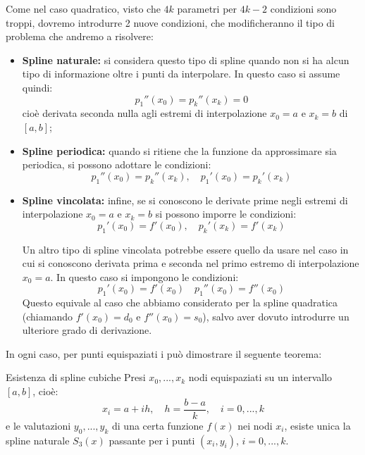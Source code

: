 \documentclass[a4paper,11pt]{article}
\begin{document}
Come nel caso quadratico, visto che $4k$ parametri per $4k - 2$ condizioni sono troppi, dovremo introdurre 2 nuove condizioni, che modificheranno il tipo di problema che andremo a risolvere:
\begin{itemize}
	\item \textbf{Spline naturale:} si considera questo tipo di spline quando non si ha alcun tipo di informazione oltre i punti da interpolare. In questo caso si assume quindi:
		$$
		p_1''(x_0) = p_k''(x_k) = 0
		$$
		cioè derivata seconda nulla agli estremi di interpolazione $x_0 = a$ e $x_k = b$ di $[a, b]$;
	\item \textbf{Spline periodica:} quando si ritiene che la funzione da approssimare sia periodica, si possono adottare le condizioni:
		$$
		p_1''(x_0) = p_k''(x_k), \quad p_1'(x_0) = p_k'(x_k)
		$$
	\item \textbf{Spline vincolata:} infine, se si conoscono le derivate prime negli estremi di interpolazione $x_0 = a$ e $x_k = b$ si possono imporre le condizioni:
		$$
		p_1'(x_0) = f'(x_0), \quad p_k'(x_k) = f'(x_k)
		$$
		
		Un altro tipo di spline vincolata potrebbe essere quello da usare nel caso in cui si conoscono derivata prima e seconda nel primo estremo di interpolazione $x_0 = a$.
		In questo caso si impongono le condizioni:
		$$
		p_1'(x_0) = f'(x_0) \quad p_1''(x_0) = f''(x_0)
		$$
		Questo equivale al caso che abbiamo considerato per la spline quadratica (chiamando $f'(x_0) = d_0$ e $f''(x_0) = s_0$), salvo aver dovuto introdurre un ulteriore grado di derivazione.
\end{itemize}

In ogni caso, per punti equispaziati i può dimostrare il seguente teorema:
\begin{theorem}{Esistenza di spline cubiche}
	Presi $x_0, ..., x_k$ nodi equispaziati su un intervallo $[a, b]$, cioè:
	$$
	x_i = a + ih, \quad h = \frac{b - a}{k}, \quad i = 0, ..., k
	$$
	e le valutazioni $y_0, ..., y_k$ di una certa funzione $f(x)$ nei nodi $x_i$, esiste unica la spline naturale $S_3(x)$ passante per i punti $(x_i, y_i)$, $i = 0, ..., k$.
\end{theorem}
\end{document}
